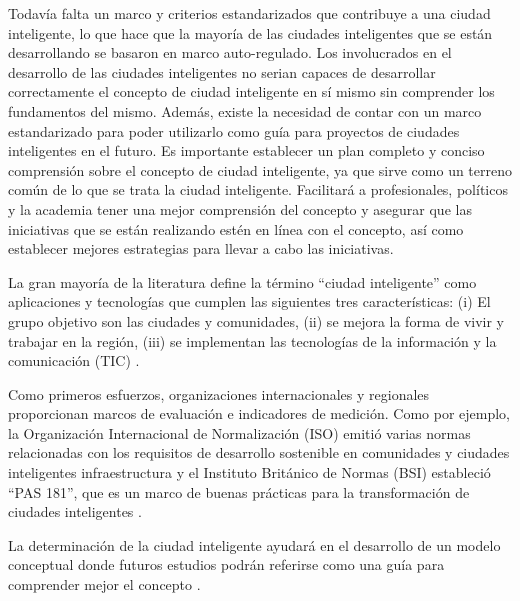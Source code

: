\documentclass[a4paper,fleqn,spanish]{cas-dc}
\begin{document}
{{Todavía falta un marco y criterios estandarizados que contribuye a una ciudad
inteligente, lo que hace que la mayoría de las ciudades inteligentes que se
están desarrollando se basaron en marco auto-regulado.
Los involucrados en el desarrollo de las ciudades inteligentes no
serian capaces de desarrollar correctamente el concepto de ciudad inteligente en
sí mismo sin comprender los fundamentos del mismo.
Además, existe la necesidad de contar con un marco estandarizado para poder
utilizarlo como guía para proyectos de ciudades inteligentes en el futuro.  Es
importante establecer un plan completo y conciso comprensión sobre el concepto
de ciudad inteligente, ya que sirve como un terreno común de lo que se trata la
ciudad inteligente.  Facilitará a profesionales, políticos y la academia tener
una mejor comprensión del concepto y asegurar que las iniciativas que se están
realizando estén en línea con el concepto, así como establecer mejores
estrategias para llevar a cabo las iniciativas.


La gran mayoría de la literatura define la término “ciudad inteligente” como
aplicaciones y tecnologías que cumplen las siguientes tres características:
(i) El grupo objetivo son las ciudades y comunidades,
(ii) se mejora la forma de vivir y trabajar en la región,
(iii) se implementan las tecnologías de la información y la comunicación (TIC)
\cite{stubinger_understanding_2020}.

Como primeros esfuerzos, organizaciones internacionales y regionales
proporcionan marcos de evaluación e indicadores de medición. Como por ejemplo, la
Organización Internacional de Normalización (ISO) emitió varias normas
relacionadas con los requisitos de desarrollo sostenible en comunidades y
ciudades inteligentes infraestructura y el Instituto Británico de Normas
(BSI) estableció “PAS 181”, que es un marco de buenas prácticas para la
transformación de ciudades inteligentes \cite{aljowder_systematic_2019}.


La determinación de la ciudad inteligente ayudará en el desarrollo de un modelo
conceptual donde futuros estudios podrán referirse como una guía para
comprender mejor el concepto \cite{wahab_systematic_2020}.

}}
\end{document}
